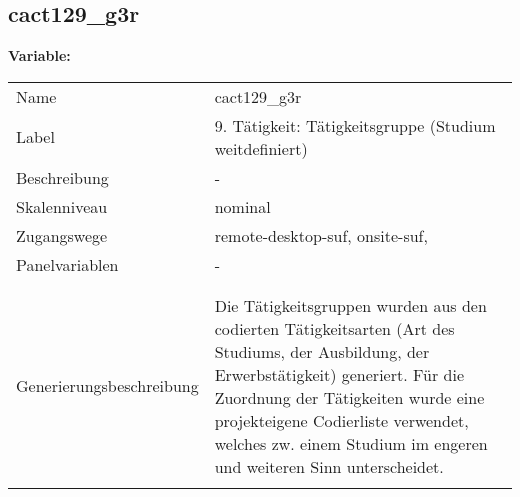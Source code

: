 	
	
	\subsection{cact129\_g3r}
	\label{subSection:cact129_g3r}

	\noindent\textbf{Variable:}\\
		\begin{tabular}{lL{11.3cm}}
			\label{tableVariable:cact129_g3r}
			Name & cact129\_g3r \\
			Label & 9. Tätigkeit: Tätigkeitsgruppe (Studium weitdefiniert) \\
			Beschreibung & - \\
			Skalenniveau & nominal \\
			Zugangswege &
				remote-desktop-suf,
				onsite-suf,
 \\
			Panelvariablen & -
			 \\
			 \\
 \\
					Generierungsbeschreibung & Die Tätigkeitsgruppen wurden aus den codierten Tätigkeitsarten (Art des Studiums, der Ausbildung, der Erwerbstätigkeit) generiert. Für die Zuordnung der Tätigkeiten wurde eine projekteigene Codierliste verwendet, welches zw. einem Studium im engeren und weiteren Sinn unterscheidet.
				 \\	
			 \\
		\end{tabular}






